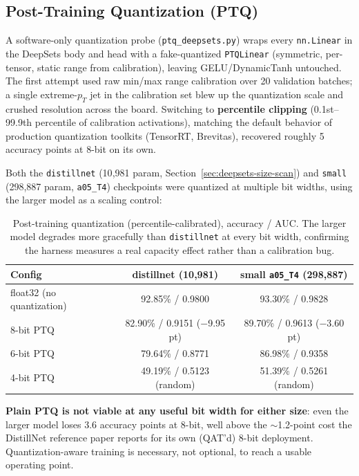 \subsection{Post-Training Quantization (PTQ)}
\label{sec:deepsets-ptq}

A software-only quantization probe (\texttt{ptq\_deepsets.py}) wraps every
\texttt{nn.Linear} in the DeepSets body and head with a fake-quantized
\texttt{PTQLinear} (symmetric, per-tensor, static range from calibration),
leaving GELU/DynamicTanh untouched. The first attempt used raw min/max range
calibration over 20 validation batches; a single extreme-$p_T$ jet in the
calibration set blew up the quantization scale and crushed resolution across
the board. Switching to \textbf{percentile clipping} (0.1st--99.9th
percentile of calibration activations), matching the default behavior of
production quantization toolkits (TensorRT, Brevitas), recovered roughly 5
accuracy points at 8-bit on its own.

Both the \texttt{distillnet} (10{,}981 param, Section~\ref{sec:deepsets-size-scan})
and \texttt{small} (298{,}887 param, \texttt{a05\_T4}) checkpoints were
quantized at multiple bit widths, using the larger model as a scaling
control:

\begin{table}[h]
    \centering
    \small
    \begin{tabular}{lcc}
        \toprule
        Config & distillnet (10{,}981) & small \texttt{a05\_T4} (298{,}887) \\
        \midrule
        float32 (no quantization) & 92.85\% / 0.9800 & 93.30\% / 0.9828 \\
        8-bit PTQ  & 82.90\% / 0.9151 ($-$9.95 pt) & 89.70\% / 0.9613 ($-$3.60 pt) \\
        6-bit PTQ  & 79.64\% / 0.8771 & 86.98\% / 0.9358 \\
        4-bit PTQ  & 49.19\% / 0.5123 (random) & 51.39\% / 0.5261 (random) \\
        \bottomrule
    \end{tabular}
    \caption{Post-training quantization (percentile-calibrated), accuracy /
    AUC. The larger model degrades more gracefully than \texttt{distillnet}
    at every bit width, confirming the harness measures a real capacity
    effect rather than a calibration bug.}
    \label{tab:deepsets-ptq}
\end{table}

\textbf{Plain PTQ is not viable at any useful bit width for either size}:
even the larger model loses 3.6 accuracy points at 8-bit, well above the
$\sim$1.2-point cost the DistillNet reference paper reports for its own
(QAT'd) 8-bit deployment. Quantization-aware training is necessary, not
optional, to reach a usable operating point.

